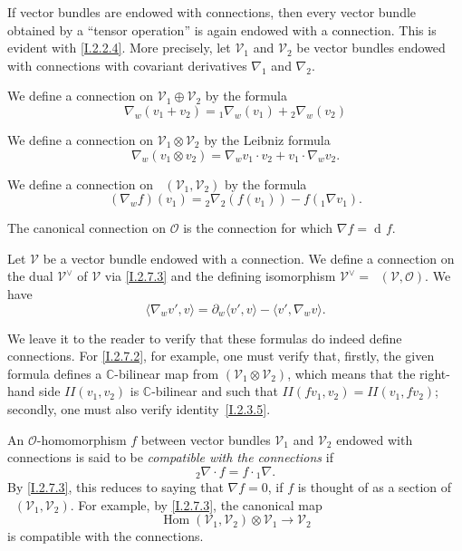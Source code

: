 \documentclass{report}
\theoremstyle{plain}
\theoremstyle{definition}
\newenvironment{env}[1]
    {\renewcommand\theinnercustomenv{#1}\innercustomenv}
    {\endinnercustomenv}
\newcommand{\sh}{\mathscr}
\DeclareMathOperator{\Hom}{Hom}
\DeclareMathOperator{\iHom}{\underline{Hom}}
\DeclareMathOperator{\dd}{d\!}
\newcommand{\oldpage}[1]{\marginpar{\footnotesize$\Big\vert$ \textit{p.~#1}}}
\begin{document}
\begin{env}{2.7}
\label{I.2.7}
  If vector bundles are endowed with connections, then every vector bundle obtained by a ``tensor operation'' is again endowed with a connection.
  This is evident with \cref{I.2.2.4}.
  More precisely, let $\sh{V}_1$ and $\sh{V}_2$ be vector bundles endowed with connections with covariant derivatives $\nabla_1$ and $\nabla_2$.

  \begin{env}{2.7.1}
  \label{I.2.7.1}
    We define a connection on $\sh{V}_1\oplus\sh{V}_2$ by the formula
    \[
      \nabla_w(v_1+v_2) = {}_1\!\nabla_w(v_1) + {}_2\!\nabla_w(v_2)
    \]
  \end{env}

  \begin{env}{2.7.2}
  \label{I.2.7.2}
    We define a connection on $\sh{V}_1\otimes\sh{V}_2$ by the Leibniz formula
    \[
      \nabla_w(v_1\otimes v_2) = \nabla_w v_1\cdot v_2 + v_1\cdot\nabla_w v_2.
    \]
  \end{env}

  \begin{env}{2.7.3}
  \label{I.2.7.3}
    We define a connection on $\iHom(\sh{V}_1,\sh{V}_2)$ by the formula
    \[
      (\nabla_w f)(v_1) = {}_2\!\nabla_2(f(v_1)) - f({}_1\!\nabla v_1).
    \]
  \end{env}

  The canonical connection on $\sh{O}$ is the connection for which $\nabla f=\dd f$.
  
  Let $\sh{V}$ be a vector bundle endowed with a connection.
  \begin{env}{2.7.4}
  \label{I.2.7.4}
    We define a connection on the dual $\sh{V}^\vee$ of $\sh{V}$ via \cref{I.2.7.3} and the defining isomorphism $\sh{V}^\vee = \iHom(\sh{V},\sh{O})$.
    We have
    \[
      \langle \nabla_w v',v \rangle = \partial_w\langle v',v \rangle - \langle v',\nabla_w v \rangle.
    \]
  \end{env}

  We leave it to the reader to verify that these formulas do indeed define connections.
  For \cref{I.2.7.2}, for example, one must verify that, firstly, the given formula defines a $\mathbb{C}$-bilinear map from $(\sh{V}_1\otimes\sh{V}_2)$, which means that the right-hand side $II(v_1,v_2)$ is $\mathbb{C}$-bilinear and such that $II(fv_1,v_2)=II(v_1,fv_2)$;
  secondly, one must also verify identity~\cref{I.2.3.5}.
\end{env}

\begin{env}{2.8}
\label{I.2.8}
  An $\sh{O}$-homomorphism $f$ between vector bundles $\sh{V}_1$ and $\sh{V}_2$ endowed with connections
\oldpage{9}
  is said to be \emph{compatible with the connections} if
  \[
    {}_2\!\nabla\cdot f = f\cdot{}_1\!\nabla.
  \]
  By \cref{I.2.7.3}, this reduces to saying that $\nabla f=0$, if $f$ is thought of as a section of $\iHom(\sh{V}_1,\sh{V}_2)$.
  For example, by \cref{I.2.7.3}, the canonical map
  \[
    \Hom(\sh{V}_1,\sh{V}_2)\otimes\sh{V}_1 \to \sh{V}_2
  \]
  is compatible with the connections.
\end{env}



\nocite{*}
\end{document}
